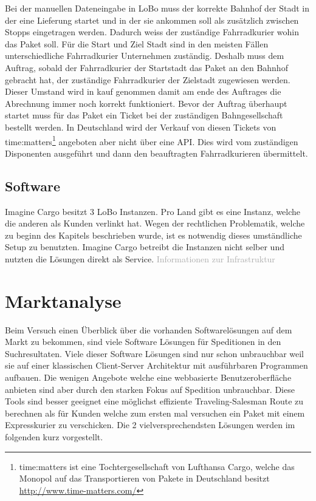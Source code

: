Bei der manuellen Dateneingabe in LoBo muss der korrekte Bahnhof der Stadt in der eine Lieferung startet und in der sie ankommen soll als zusätzlich zwischen Stopps eingetragen werden. Dadurch weiss der zuständige Fahrradkurier wohin das Paket soll.  Für die Start und Ziel Stadt sind in den meisten Fällen unterschiedliche Fahrradkurier Unternehmen zuständig. Deshalb muss dem Auftrag, sobald der Fahrradkurier der Startstadt das Paket an den Bahnhof gebracht hat, der zuständige Fahrradkurier der Zielstadt zugewiesen werden. Dieser Umstand wird in kauf genommen damit am ende des Auftrages die Abrechnung immer noch korrekt funktioniert. Bevor der Auftrag überhaupt startet muss für das Paket ein Ticket bei der zuständigen Bahngesellschaft bestellt werden. In Deutschland wird der Verkauf von diesen Tickets von time:matters\footnote{time:matters ist eine Tochtergesellschaft von Lufthansa Cargo, welche das Monopol auf das Transportieren von Pakete in Deutschland besitzt \url{http://www.time-matters.com/}} angeboten aber nicht über eine API. Dies wird vom zuständigen Disponenten ausgeführt und dann den beauftragten Fahrradkurieren übermittelt.

\subsection{Software}
Imagine Cargo besitzt 3 LoBo Instanzen. Pro Land gibt es eine Instanz, welche die anderen als Kunden verlinkt hat. Wegen der rechtlichen Problematik, welche zu beginn des Kapitels beschrieben wurde, ist es notwendig dieses umständliche Setup zu benutzten. Imagine Cargo betreibt die Instanzen nicht selber und nutzten die Lösungen direkt als Service.
\textcolor{darkgray}{
  Informationen zur Infrastruktur
}


\section{Marktanalyse}
Beim Versuch einen Überblick über die vorhanden Softwarelösungen auf dem Markt zu bekommen, sind viele Software Lösungen für Speditionen in den Suchresultaten. Viele dieser Software Lösungen sind nur schon unbrauchbar weil sie auf einer klassischen Client-Server Architektur mit ausführbaren Programmen aufbauen. Die wenigen Angebote welche eine webbasierte Benutzeroberfläche anbieten sind aber durch den starken Fokus auf Spedition unbrauchbar. Diese Tools sind besser geeignet eine möglichst effiziente Traveling-Salesman Route zu berechnen als für Kunden welche zum ersten mal versuchen ein Paket mit einem Expresskurier zu verschicken. Die 2 vielversprechendsten Lösungen werden im folgenden kurz vorgestellt.

